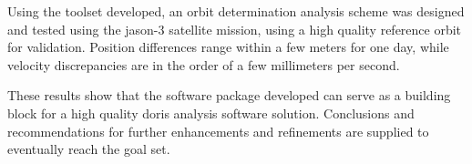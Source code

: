 Using the toolset developed, an orbit determination analysis scheme was designed and
tested using the \gls{jason}-3 satellite mission, using a high quality reference orbit
for validation. Position differences range within a few meters for one day, while
velocity discrepancies are in the order of a few millimeters per second. 

These results show that the software package developed can serve as a building 
block for a high quality \gls{doris} analysis software solution. Conclusions and 
recommendations for further enhancements and refinements are supplied to eventually 
reach the goal set.
